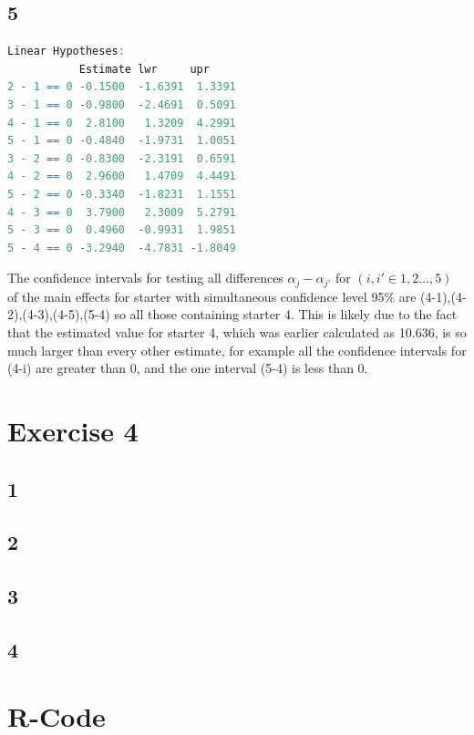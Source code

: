 \documentclass{article}
\begin{document}
    \subsection*{5}
      \begin{lstlisting}[language=R]
Linear Hypotheses:
           Estimate lwr     upr    
2 - 1 == 0 -0.1500  -1.6391  1.3391
3 - 1 == 0 -0.9800  -2.4691  0.5091
4 - 1 == 0  2.8100   1.3209  4.2991
5 - 1 == 0 -0.4840  -1.9731  1.0051
3 - 2 == 0 -0.8300  -2.3191  0.6591
4 - 2 == 0  2.9600   1.4709  4.4491
5 - 2 == 0 -0.3340  -1.8231  1.1551
4 - 3 == 0  3.7900   2.3009  5.2791
5 - 3 == 0  0.4960  -0.9931  1.9851
5 - 4 == 0 -3.2940  -4.7831 -1.8049
      \end{lstlisting}
    The confidence intervals for testing all differences $\alpha_j - \alpha_{j'}$ for $(i,i' \in {1,2...,5})$ of the main effects for starter with simultaneous confidence level 95\% are (4-1),(4-2),(4-3),(4-5),(5-4) so all those containing starter 4. This is likely due to the fact that the estimated value for starter 4, which was earlier calculated as 10.636, is so much larger than every other estimate, for example all the confidence intervals for (4-i) are greater than 0, and the one interval (5-4) is less than 0.
  \section*{Exercise 4}
    \subsection*{1}
    
    \subsection*{2}
    
    \subsection*{3}
    
    \subsection*{4}

    
  \section{R-Code}
\end{document}

